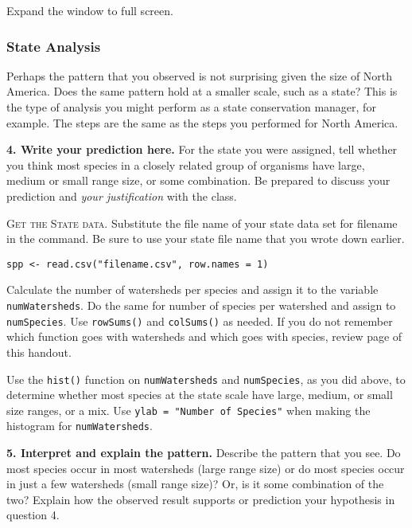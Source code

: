 \documentclass[11pt]{article}
\begin{document}
Expand the window to full screen. 

\subsubsection*{State Analysis}

Perhaps the pattern that you observed is not surprising given the size
of North America. Does the same pattern hold at a smaller scale, such as a state?
This is the type of analysis you might perform as a state conservation
manager, for example. The steps are the same as the steps you
performed for North America.

\textbf{4. Write your prediction here.} For the state you were assigned, 
tell whether you think most species in a closely related
group of organisms have large, medium or small range size, or some
combination. Be prepared to discuss your prediction and \emph{your
justification} with the class.

\vspace{7\baselineskip}

\textsc{Get the State data.} Substitute the file name of your state data set for filename in
the command. Be sure to use your state file name that you wrote down
earlier.


\texttt{spp \textless{}-
read.csv("filename.csv", row.names = 1)}

Calculate the number of watersheds per species and assign it to the
variable \texttt{numWatersheds}. Do the same for number of species per
watershed and assign to \texttt{numSpecies}. Use \texttt{rowSums()} and
\texttt{colSums()} as needed. If you do not remember which function goes
with watersheds and which goes with species, review page \pageref{tab:colrowsums} of this handout.

Use the \texttt{hist()} function on \texttt{numWatersheds} and \texttt{numSpecies}, as you did above,
to determine whether most species at the state scale have large, medium, or
small size ranges, or a mix.  Use \texttt{ylab = "Number of Species"} when making the histogram
for \texttt{numWatersheds}. 

\textbf{5. Interpret and explain the pattern.} Describe the pattern that you see. Do most
species occur in most watersheds (large range size) or do most species
occur in just a few watersheds (small range size)? Or, is it some
combination of the two? Explain how the observed result supports or
prediction your hypothesis in question 4.
\end{document}
